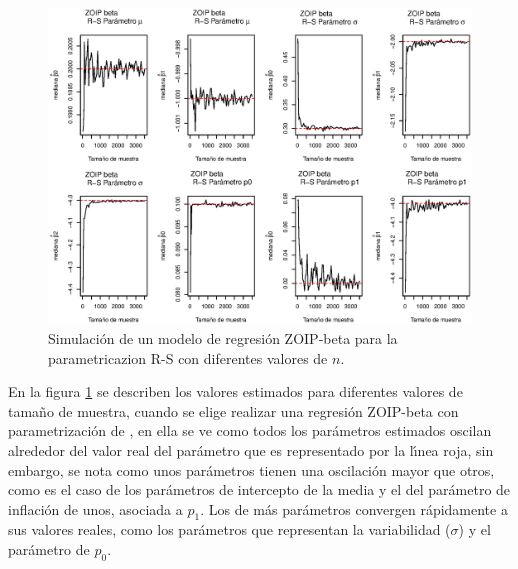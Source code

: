 \begin{figure}
	\begin{center}
		\includegraphics[scale=0.5]{Converg_RS.eps}	
		\caption{Simulaci\'{o}n de un modelo de regresi\'{o}n ZOIP-beta para la parametricazion R-S con diferentes valores de $n$.}
		\label{Simu_RS}
	\end{center}
\end{figure}

En la figura \ref{Simu_RS} se describen los valores estimados para diferentes valores de tama\~{n}o de muestra, cuando se elige realizar una regresi\'{o}n ZOIP-beta con parametrizaci\'{o}n de \cite{Stasinopoulos2}, en ella se ve como todos los par\'{a}metros estimados oscilan alrededor del valor real del par\'{a}metro que es representado por la l\'{\i}nea roja, sin embargo, se nota como unos par\'{a}metros tienen una oscilaci\'{o}n mayor que otros, como es el caso de los par\'{a}metros de intercepto de la media y el del par\'{a}metro de inflaci\'{o}n de unos, asociada a $p_1$. Los de m\'{a}s par\'{a}metros convergen r\'{a}pidamente a sus valores reales, como los par\'{a}metros que representan la variabilidad ($\sigma$) y el par\'{a}metro de $p_0$.\\

